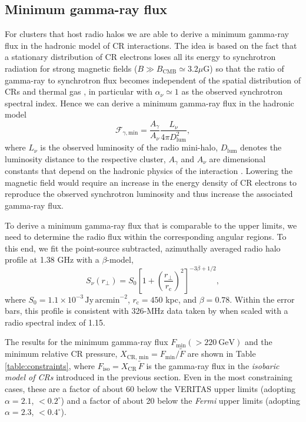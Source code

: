 \documentclass[12pt,manuscript]{aastex}
\newcommand{\rmn}{\mathrm}
\newcommand{\CR}{\mathrm{CR}}
\newcommand{\dps}{\displaystyle}
\begin{document}
%
%

\subsection{Minimum gamma-ray flux}
For clusters that host radio halos we are able to derive a minimum gamma-ray flux in the hadronic
model of CR interactions. The idea is based on the fact that a stationary distribution of CR
electrons loses all its energy to synchrotron radiation for strong magnetic fields
($B \gg B_{\rmn{CMB}} \simeq 3.2 \mu$G) so that the ratio of gamma-ray to synchrotron flux becomes
independent of the spatial distribution of CRs and thermal gas \citep{article:Voelk:1989,
article:Pohl:1994, article:Pfrommer:2008}, in particular with $\alpha_{\nu}\simeq 1$ as the
observed synchrotron spectral index.  Hence we can derive a minimum gamma-ray flux in the hadronic
model
\begin{equation}
\label{eq:Fmin}
\mathcal{F}_{\gamma,\rmn{min}} = \frac{\dps A_{\gamma}}{\dps A_{\nu}}\frac{\dps L_{\nu}}{\dps 4\pi D_{\rmn{lum}}^{2}},
\end{equation}
where $L_{\nu}$ is the observed luminosity of the radio mini-halo, $D_{\rmn{lum}}$ denotes the
luminosity distance to the respective cluster, $A_\gamma$ and $A_\nu$ are dimensional constants
that depend on the hadronic physics of the interaction \citep{article:Pfrommer:2008,
Pfrommer_etal:2008}. Lowering the magnetic field would require an increase in the energy density of
CR electrons to reproduce the observed synchrotron luminosity and thus increase the associated
gamma-ray flux.

To derive a minimum gamma-ray flux that is comparable to the upper limits, we need to determine the
radio flux within the corresponding angular regions. To this end, we fit the point-source
subtracted, azimuthally averaged radio halo profile at 1.38 GHz \citep{article:Deiss_etal:1997}
with a $\beta$-model,
\begin{equation}
\label{beta}
 S_{\nu} (r_{\bot})= S_{0} \left[ 1 + \left( \frac{r_{\bot}}{r_{\rmn{c}}}\right)^{2}\right]^{-3\beta + 1/2},
\end{equation}
where $S_{0} = 1.1 \times 10^{-3}\,\rmn{Jy\,arcmin}^{-2}$, $r_{\rmn{c}} = 450$ kpc, and
$\beta = 0.78$.  Within the error bars, this profile is consistent with 326-MHz data taken by
\citet{article:Govoni_etal:2001} when scaled with a radio spectral index of 1.15. 

The results for the minimum gamma-ray flux $F_{\rmn{min}}(>220~\rmn{GeV})$ and the minimum relative
CR pressure, $X_{\CR,\,\rmn{min}} = F_{\rmn{min}}/\tilde{F}$ are shown in Table
\ref{table:constraints}, where $F_\rmn{iso} = X_\CR\,\tilde{F}$ is the gamma-ray flux in the {\em
isobaric model of CRs} introduced in the previous section. Even in the most constraining cases,
these are a factor of about 60 below the VERITAS upper limits (adopting $\alpha=2.1$,
$<0.2^{\circ}$) and a factor of about 20 below the {\em Fermi} upper limits (adopting $\alpha=2.3$,
$<0.4^{\circ}$).
\end{document}
